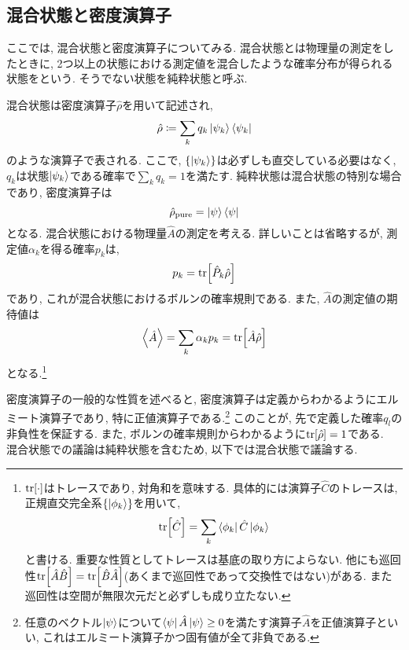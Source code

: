 \subsection{混合状態と密度演算子}
ここでは, 混合状態と密度演算子についてみる. 混合状態とは物理量の測定をしたときに, 2つ以上の状態における測定値を混合したような確率分布が得られる状態をという. そうでない状態を純粋状態と呼ぶ. 

混合状態は密度演算子\(\hat{\rho}\)を用いて記述され, 
\begin{equation}
  \hat{\rho}\coloneqq\sum_kq_k\ket{\psi_k}\bra{\psi_k}
\end{equation}
のような演算子で表される. ここで, \(\{\ket{\psi_k}\}\)は必ずしも直交している必要はなく, \(q_k\)は状態\(\ket{\psi_k}\)である確率で\(\sum_kq_k=1\)を満たす. 純粋状態は混合状態の特別な場合であり, 密度演算子は
\begin{equation}
  \hat{\rho}_{\si{pure}}=\ket{\psi}\bra{\psi}
\end{equation}
となる. 混合状態における物理量\(\hat{A}\)の測定を考える. 詳しいことは省略するが, 測定値\(\alpha_k\)を得る確率\(p_k\)は, 
\begin{equation}
  p_k=\tr[\hat{P}_k\hat{\rho}]
\end{equation}
であり, これが混合状態におけるボルンの確率規則である. また, \(\hat{A}\)の測定値の期待値は
\begin{equation}
  \ev{\hat{A}}=\sum_k\alpha_kp_k=\tr[\hat{A}\hat{\rho}]
\end{equation}
となる.\footnote{\(\tr[\cdot]\)はトレースであり, 対角和を意味する. 具体的には演算子\(\hat{C}\)のトレースは, 正規直交完全系\(\{\ket{\phi_k}\}\)を用いて, 
\begin{equation}
  \tr[\hat{C}]=\sum_k\bra{\phi_k}\hat{C}\ket{\phi_k}
\end{equation}
と書ける. 重要な性質としてトレースは基底の取り方によらない. 他にも巡回性\(\tr[\hat{A}\hat{B}]=\tr[\hat{B}\hat{A}]\)(あくまで巡回性であって交換性ではない)がある. また巡回性は空間が無限次元だと必ずしも成り立たない.}

密度演算子の一般的な性質を述べると, 密度演算子は定義からわかるようにエルミート演算子であり, 特に正値演算子である.\footnote{任意のベクトル\(\ket{\psi}\)について\(\bra{\psi}\hat{A}\ket{\psi}\geq0\)を満たす演算子\(\hat{A}\)を正値演算子といい, これはエルミート演算子かつ固有値が全て非負である.} このことが, 先で定義した確率\(q_l\)の非負性を保証する. また, ボルンの確率規則からわかるように\(\tr[\hat{\rho}]=1\)である.\\

混合状態での議論は純粋状態を含むため, 以下では混合状態で議論する.
